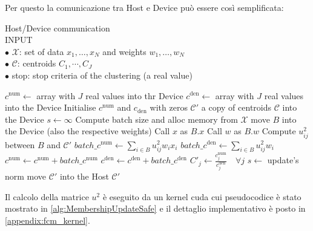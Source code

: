 \begin{toDo}
	\noindent Per questo la comunicazione tra Host e Device può essere così semplificata:


	\begin{algorithm}[ht]
		\caption{Host/Device communication\\
			\textsc{INPUT}\\
			$\bullet$ $\mathcal{X}$: set of data $x_1,\ldots,x_N$ and weights $w_1,\ldots,w_N$\\
			$\bullet$ $\mathcal{C}$: centroids $C_1,\cdots,C_J$\\
			$\bullet$ stop: stop criteria of the clustering (a real value)
		}
		\begin{algorithmic}[1]
				\State $c^\text{num} \gets $ array with $J$ real values into thr Device
				\State $c^\text{den} \gets $ array with $J$ real values into the Device
				\State Initialise $c^\text{num}$ and $c_\text{den}$ with zeros
				\State $\mathcal{C}'$ a copy of centroids $\mathcal{C}$ into the Device
				\State $s \gets \infty$
					\State Compute batch size and alloc memory from $\mathcal{X}$
						\State move $B$ into the Device (also the respective weights)
						\State Call $x$ as $B.x$
						\State Call $w$ as $B.w$
						\State Compute $u_{ij}^2$ between $B$ and $\mathcal{C}'$
						\State $batch\_c^\text{num} \gets \sum_{i\in B} u_{ij}^2w_ix_i$
						\State $batch\_c^\text{den} \gets \sum_{i\in B} u_{ij}^2w_i$
						\State $c^\text{num} \gets c^\text{num} + batch\_c^\text{num}$
						\State $c^\text{den} \gets c^\text{den} + batch\_c^\text{den}$
					\EndFor
					\State $C'_j \gets \frac{c^\text{num}_j}{ c^\text{den}_j} \quad \forall j$
					\State $s \gets $ update's norm
				\EndWhile
				\State move $\mathcal{C}'$ into the Host
				\State \Return $\mathcal{C}'$
			\EndFunction
			\label{alg:FCMwrapper}
		\end{algorithmic}
	\end{algorithm}

	\noindent Il calcolo della matrice $u^2$ è eseguito da un kernel \gls{cuda} cui pseudocodice è stato mostrato in \cref{alg:MembershipUpdateSafe} e il dettaglio implementativo è posto in \cref{appendix:fcm_kernel}.


\end{toDo}
